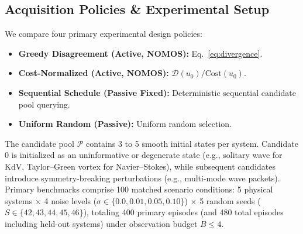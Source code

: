 \documentclass[twocolumn,10pt,a4paper]{article}
\begin{document}
\subsection{Acquisition Policies \& Experimental Setup}
We compare four primary experimental design policies:
\begin{itemize}
    \item \textbf{Greedy Disagreement (Active, NOMOS):} Eq.~\eqref{eq:divergence}.
    \item \textbf{Cost-Normalized (Active, NOMOS):} $\mathcal{D}(u_0) / \text{Cost}(u_0)$.
    \item \textbf{Sequential Schedule (Passive Fixed):} Deterministic sequential candidate pool querying.
    \item \textbf{Uniform Random (Passive):} Uniform random selection.
\end{itemize}
The candidate pool $\mathcal{P}$ contains 3 to 5 smooth initial states per system. Candidate 0 is initialized as an uninformative or degenerate state (e.g., solitary wave for KdV, Taylor--Green vortex for Navier--Stokes), while subsequent candidates introduce symmetry-breaking perturbations (e.g., multi-mode wave packets). Primary benchmarks comprise 100 matched scenario conditions: 5 physical systems $\times$ 4 noise levels ($\sigma \in \{0.0, 0.01, 0.05, 0.10\}$) $\times$ 5 random seeds ($S \in \{42, 43, 44, 45, 46\}$), totaling 400 primary episodes (and 480 total episodes including held-out systems) under observation budget $B \le 4$.

\begin{table}[t]
\centering
\small
\caption{\textbf{Certified Zero-Leakage Paired Statistical Tests across 100 Matched Scenarios.} Comparing Active Disagreement against Passive Fixed and Random schedules across 5 physical systems $\times$ 4 noise levels $\times$ 5 random seeds under Category B Blind Equation Identification with distractor terms. Tier~1 exact recovery requires exact operator support and parameter relative error $\le 10\%$.}
\label{tab:paired_stats}
\end{table}
\end{document}
